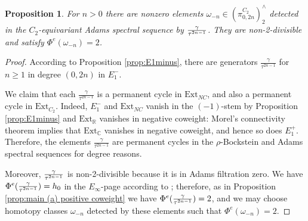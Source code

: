\documentclass[psamsfonts]{amsart}
\newcommand{\C}{\mathbb C}
\newcommand{\Z}{\mathbb Z}
\newcommand{\fN}{\mathfrak N}
\newcommand{\Ext}{\mathrm {Ext}}
\newtheorem{proposition}[theorem]{Proposition}
\theoremstyle{definition}
\theoremstyle{remark}
\newcommand{\R}{\mathbb{R}}
\numberwithin{equation}{section}
\begin{document}
\begin{proposition}\label{prop:main (a) negative coweight}
For $n > 0$ there are nonzero elements $\omega_{-n} \in (\pi_{0,2n}^{C_2})^\wedge_2$ detected in the $C_2$-equivariant Adams spectral sequence by ${\gamma\over \tau^{2n-1}}$. They are non-2-divisible and satisfy $\Phi^e(\omega_{-n})=2$.
\end{proposition}
\begin{proof}
According to Proposition \ref{prop:E1minus}, there are generators
$\frac{\gamma}{\tau^{2n-1}}$ for $n\geq 1$ in degree $(0, 2n)$ in $E_1^-$. 

We claim that each $\frac{\gamma}{\tau^{2n-1}}$ is a permanent cycle in $\Ext_{NC}$, and also a permanent cycle in $\Ext_{C_2}$. Indeed, $E_1^-$ and $\Ext_{NC}$ vanish in the $(-1)$-stem by Proposition \ref{prop:E1minus} and $\Ext_\R$ vanishes in negative coweight: Morel's connectivity theorem \cite{Morel} implies that $\Ext_\C$ vanishes in negative coweight, and hence so does $E_1^+$. Therefore, the elements $\frac{\gamma}{\tau^{2n-1}}$ are permanent cycles in the $\rho$-Bockstein and Adams spectral sequences for degree reasons. 

Moreover, ${\gamma\over \tau^{2n-1}}$ is non-2-divisible because it is in Adams filtration zero. We have $\Phi^e({\gamma\over \tau^{2n-1}})=h_0$ in the $E_\infty$-page according to \cite[Proposition 3.5]{K}; therefore, as in Proposition \ref{prop:main (a) positive coweight} we have $\Phi^e({\gamma\over \tau^{2n-1}}) = 2$, and we may choose homotopy classes $\omega_{-n}$ detected by these elements such that $\Phi^e(\omega_{-n})=2$.
\end{proof}



\end{document}
